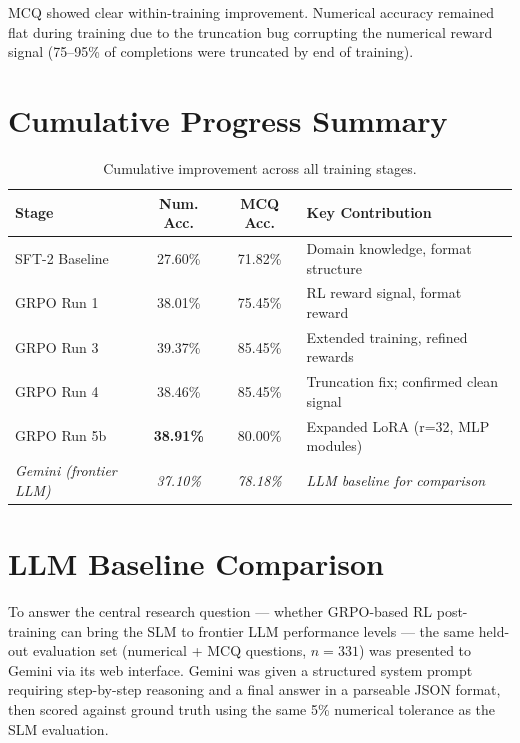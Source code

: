\documentclass[12pt]{report}
\begin{document}
MCQ showed clear within-training improvement. Numerical accuracy remained flat during training due to the truncation bug corrupting the numerical reward signal (75--95\% of completions were truncated by end of training).

\section{Cumulative Progress Summary}

\begin{table}[H]
\centering
\caption{Cumulative improvement across all training stages.}
\label{tab:cumulative}
\begin{tabular}{lccl}
\toprule
\textbf{Stage} & \textbf{Num. Acc.} & \textbf{MCQ Acc.} & \textbf{Key Contribution} \\
\midrule
SFT-2 Baseline & 27.60\% & 71.82\% & Domain knowledge, format structure \\
GRPO Run 1     & 38.01\% & 75.45\% & RL reward signal, format reward \\
GRPO Run 3     & 39.37\% & 85.45\% & Extended training, refined rewards \\
GRPO Run 4     & 38.46\% & 85.45\% & Truncation fix; confirmed clean signal \\
GRPO Run 5b    & \textbf{38.91\%} & 80.00\% & Expanded LoRA (r=32, MLP modules) \\
\midrule
\textit{Gemini (frontier LLM)} & \textit{37.10\%} & \textit{78.18\%} & \textit{LLM baseline for comparison} \\
\bottomrule
\end{tabular}
\end{table}

\section{LLM Baseline Comparison}
\label{sec:llm_baseline}

To answer the central research question --- whether GRPO-based RL post-training can bring the SLM to frontier LLM performance levels --- the same held-out evaluation set (numerical + MCQ questions, $n=331$) was presented to Gemini via its web interface. Gemini was given a structured system prompt requiring step-by-step reasoning and a final answer in a parseable JSON format, then scored against ground truth using the same 5\% numerical tolerance as the SLM evaluation.
\end{document}
